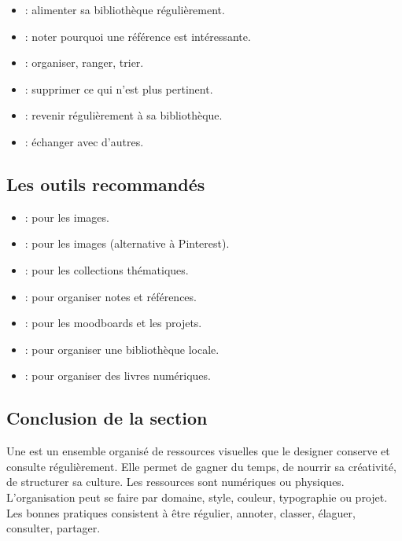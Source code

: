 \begin{itemize}
    \item {} : alimenter sa bibliothèque régulièrement.
    \item {} : noter pourquoi une référence est intéressante.
    \item {} : organiser, ranger, trier.
    \item {} : supprimer ce qui n'est plus pertinent.
    \item {} : revenir régulièrement à sa bibliothèque.
    \item {} : échanger avec d'autres.
\end{itemize}

\subsection{Les outils recommandés}

\begin{itemize}
    \item {} : pour les images.
    \item {} : pour les images (alternative à Pinterest).
    \item {} : pour les collections thématiques.
    \item {} : pour organiser notes et références.
    \item {} : pour les moodboards et les projets.
    \item {} : pour organiser une bibliothèque locale.
    \item {} : pour organiser des livres numériques.
\end{itemize}

\subsection*{Conclusion de la section}

\begin{retenir}
Une  est un ensemble organisé de ressources visuelles que le designer conserve et consulte régulièrement. Elle permet de gagner du temps, de nourrir sa créativité, de structurer sa culture. Les ressources sont numériques ou physiques. L'organisation peut se faire par domaine, style, couleur, typographie ou projet. Les bonnes pratiques consistent à être régulier, annoter, classer, élaguer, consulter, partager.
\end{retenir}

